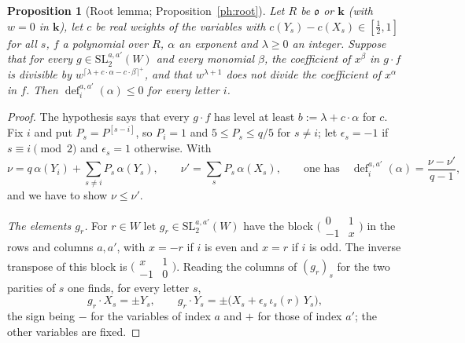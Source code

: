 \documentclass[10pt]{amsart}
\newtheorem{proposition}[theorem]{Proposition}
\theoremstyle{definition}
\theoremstyle{remark}
\providecommand{\pao}{\mathfrak o}
\providecommand{\phdef}{\operatorname{def}}
\providecommand{\phk}{\boldsymbol k}
\begin{document}
\begin{proposition}[Root lemma; Proposition~\ref{ph:root}]\label{pe:root}
Let $R$ be $\pao$ or $\phk$ (with $w=0$ in $\phk$), let $c$ be real weights of the variables with
$c(Y_s)-c(X_s)\in[\tfrac12,1]$ for all $s$, $f$ a polynomial over $R$, $\alpha$ an exponent and
$\lambda\ge0$ an integer. Suppose that for every $g\in\mathrm{SL}_2^{a,a'}(W)$ and every monomial
$\beta$, the coefficient of $x^\beta$ in $g\cdot f$ is divisible by $w^{\lceil\lambda+c\cdot\alpha
-c\cdot\beta\rceil^+}$, and that $w^{\lambda+1}$ does not divide the coefficient of $x^\alpha$ in
$f$. Then $\phdef_i^{a,a'}(\alpha)\le0$ for every letter $i$.
\end{proposition}
\begin{proof}
The hypothesis says that every $g\cdot f$ has level at least $b:=\lambda+c\cdot\alpha$ for $c$. Fix
$i$ and put $P_s=P^{[s-i]}$, so $P_i=1$ and $5\le P_s\le q/5$ for $s\ne i$; let $\epsilon_s=-1$ if
$s\equiv i\pmod2$ and $\epsilon_s=1$ otherwise. With
\[
\nu=q\,\alpha(Y_i)+\sum_{s\ne i}P_s\,\alpha(Y_s),\qquad\nu'=\sum_{s}P_s\,\alpha(X_s),\qquad
\text{one has}\quad\phdef_i^{a,a'}(\alpha)=\frac{\nu-\nu'}{q-1},
\]
and we have to show $\nu\le\nu'$.

\emph{The elements $g_r$.} For $r\in W$ let $g_r\in\mathrm{SL}_2^{a,a'}(W)$ have the block
$\bigl(\begin{smallmatrix}0&1\\-1&x\end{smallmatrix}\bigr)$ in the rows and columns $a,a'$, with
$x=-r$ if $i$ is even and $x=r$ if $i$ is odd. The inverse transpose of this block is
$\bigl(\begin{smallmatrix}x&1\\-1&0\end{smallmatrix}\bigr)$. Reading the columns of $(g_r)_s$ for
the two parities of $s$ one finds, for every letter $s$,
\begin{equation}\label{pe:eq-gr}
g_r\cdot X_s=\pm Y_s,\qquad g_r\cdot Y_s=\pm\bigl(X_s+\epsilon_s\,\iota_s(r)\,Y_s\bigr),
\end{equation}
the sign being $-$ for the variables of index $a$ and $+$ for those of index $a'$; the other
variables are fixed.


\end{proof}
\end{document}
